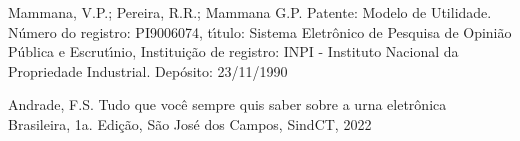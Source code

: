 \documentclass[
12pt,		%
openright,	%
twoside,  %
a4paper,			%
chapter=TITLE,		%
english,			%
french,				%
spanish,			%
brazil				%
]{USPSC-classe/USPSC}
\begin{document}
\begin{flushleft}
\begin{flushleft}
\begin{flushleft}
\begin{flushleft}
\begin{flushleft}
\begin{flushleft}
\begin{flushleft}
\begin{flushleft}
[MAMMANA et al., 1990] Mammana, V.P.; Pereira, R.R.; Mammana G.P. Patente: Modelo de Utilidade. N\'umero do registro: PI9006074, t\'{\i}tulo: \textquotedbl Sistema Eletr\^onico de Pesquisa de Opini\~ao P\'ublica e Escrut\'{\i}nio\textquotedbl  , Institui\c{c}\~ao de registro: INPI - Instituto Nacional da Propriedade Industrial. Dep\'osito: 23/11/1990
\end{flushleft}


\end{flushleft}


\end{flushleft}


\end{flushleft}


\end{flushleft}


\end{flushleft}


\end{flushleft}


\end{flushleft}


\begin{flushleft}
\begin{flushleft}
\begin{flushleft}
\begin{flushleft}
\begin{flushleft}
\begin{flushleft}
\begin{flushleft}
\begin{flushleft}
[ANDRADE, 2022] Andrade, F.S. Tudo que voc\^e sempre quis saber sobre a urna eletr\^onica Brasileira, 1a. Edi\c{c}\~ao, S\~ao Jos\'e dos Campos, SindCT, 2022
\end{flushleft}


\end{flushleft}


\end{flushleft}


\end{flushleft}


\end{flushleft}


\end{flushleft}


\end{flushleft}


\end{flushleft}
\end{document}
